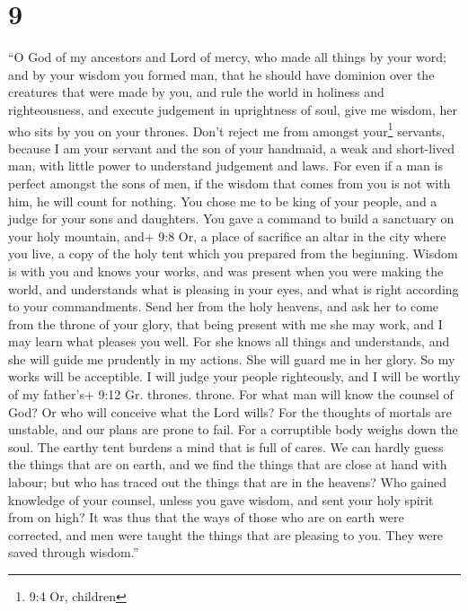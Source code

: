 \hypertarget{section-8}{%
\section{9}\label{section-8}}

 ``O God of my ancestors and Lord of mercy, who made all
things by your word;  and by your wisdom you formed man,
that he should have dominion over the creatures that were made by you,
 and rule the world in holiness and righteousness, and
execute judgement in uprightness of soul,  give me wisdom,
her who sits by you on your thrones. Don't reject me from amongst
your\footnote{9:4 Or, children} servants,  because I am your
servant and the son of your handmaid, a weak and short-lived man, with
little power to understand judgement and laws.  For even if
a man is perfect amongst the sons of men, if the wisdom that comes from
you is not with him, he will count for nothing.  You chose
me to be king of your people, and a judge for your sons and daughters.
 You gave a command to build a sanctuary on your holy
mountain, and+ 9:8 Or, a place of sacrifice an altar in the city where
you live, a copy of the holy tent which you prepared from the beginning.
 Wisdom is with you and knows your works, and was present
when you were making the world, and understands what is pleasing in your
eyes, and what is right according to your commandments. 
Send her from the holy heavens, and ask her to come from the throne of
your glory, that being present with me she may work, and I may learn
what pleases you well.  For she knows all things and
understands, and she will guide me prudently in my actions. She will
guard me in her glory.  So my works will be acceptible. I
will judge your people righteously, and I will be worthy of my father's+
9:12 Gr. thrones. throne.  For what man will know the
counsel of God? Or who will conceive what the Lord wills? 
For the thoughts of mortals are unstable, and our plans are prone to
fail.  For a corruptible body weighs down the soul. The
earthy tent burdens a mind that is full of cares.  We can
hardly guess the things that are on earth, and we find the things that
are close at hand with labour; but who has traced out the things that
are in the heavens?  Who gained knowledge of your counsel,
unless you gave wisdom, and sent your holy spirit from on high?
 It was thus that the ways of those who are on earth were
corrected, and men were taught the things that are pleasing to you. They
were saved through wisdom.''

